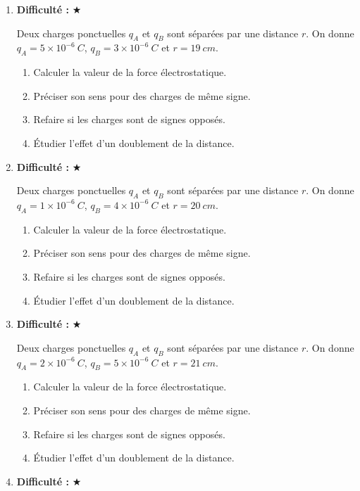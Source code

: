 \documentclass[11pt,a4paper]{article}
\newcommand{\etoiles}[1]{\textbf{Difficulté : }#1}
\begin{document}
\begin{enumerate}[label=\textbf{Exercice \arabic*.},leftmargin=*]
Deux charges ponctuelles $q_A$ et $q_B$ sont séparées par une distance $r$.
On donne $q_A=4\times 10^{-6}\ \si{C}$, $q_B=2\times 10^{-6}\ \si{C}$ et $r=18\ \si{cm}$.
\begin{enumerate}[label=\alph*)]
\item Calculer la valeur de la force électrostatique.
\item Préciser son sens pour des charges de même signe.
\item Refaire si les charges sont de signes opposés.
\item Étudier l'effet d'un doublement de la distance.
\end{enumerate}
\item \etoiles{★}

Deux charges ponctuelles $q_A$ et $q_B$ sont séparées par une distance $r$.
On donne $q_A=5\times 10^{-6}\ \si{C}$, $q_B=3\times 10^{-6}\ \si{C}$ et $r=19\ \si{cm}$.
\begin{enumerate}[label=\alph*)]
\item Calculer la valeur de la force électrostatique.
\item Préciser son sens pour des charges de même signe.
\item Refaire si les charges sont de signes opposés.
\item Étudier l'effet d'un doublement de la distance.
\end{enumerate}
\item \etoiles{★}

Deux charges ponctuelles $q_A$ et $q_B$ sont séparées par une distance $r$.
On donne $q_A=1\times 10^{-6}\ \si{C}$, $q_B=4\times 10^{-6}\ \si{C}$ et $r=20\ \si{cm}$.
\begin{enumerate}[label=\alph*)]
\item Calculer la valeur de la force électrostatique.
\item Préciser son sens pour des charges de même signe.
\item Refaire si les charges sont de signes opposés.
\item Étudier l'effet d'un doublement de la distance.
\end{enumerate}
\item \etoiles{★}

Deux charges ponctuelles $q_A$ et $q_B$ sont séparées par une distance $r$.
On donne $q_A=2\times 10^{-6}\ \si{C}$, $q_B=5\times 10^{-6}\ \si{C}$ et $r=21\ \si{cm}$.
\begin{enumerate}[label=\alph*)]
\item Calculer la valeur de la force électrostatique.
\item Préciser son sens pour des charges de même signe.
\item Refaire si les charges sont de signes opposés.
\item Étudier l'effet d'un doublement de la distance.
\end{enumerate}
\item \etoiles{★}


\end{enumerate}
\end{document}
